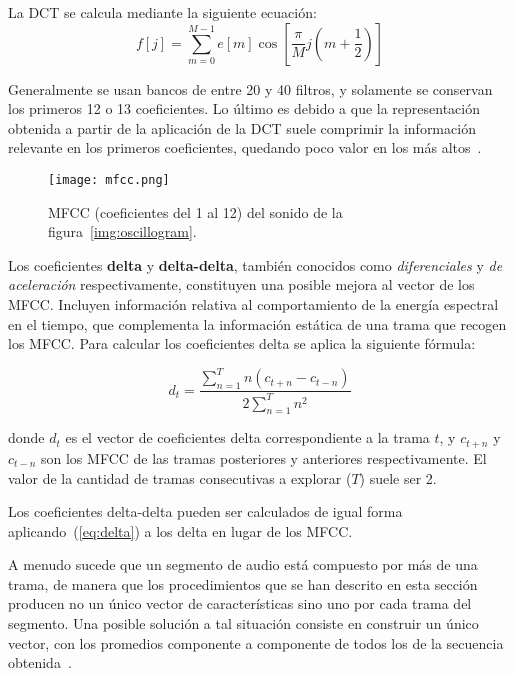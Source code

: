 La DCT se calcula mediante la siguiente ecuación:
\begin{equation}
    \label{eq:DCT}
    f[j] = \sum_{m=0}^{M-1}{e[m]\cos{\left[ \frac{\pi}{M}j\left( m + \frac{1}{2} \right) \right]}}
\end{equation}

Generalmente se usan bancos de entre 20 y 40 filtros, y solamente se conservan los primeros 12 o 13 coeficientes.
Lo último es debido a que la representación obtenida a partir de la aplicación de la DCT suele comprimir la información relevante en los primeros coeficientes, quedando poco valor en los más altos~\cite{Davis80}.

\begin{figure}[!h]
    \centering
    \texttt{[image: mfcc.png]}
    \caption{MFCC (coeficientes del 1 al 12) del sonido de la figura~\ref{img:oscillogram}.}
    \label{img:mfcc}
\end{figure}

Los coeficientes \textbf{delta} y \textbf{delta-delta}, también conocidos como \textit{diferenciales} y \textit{de aceleración} respectivamente,
constituyen una posible mejora al vector de los MFCC\@.
Incluyen información relativa al comportamiento de la energía espectral en el tiempo, que complementa la información estática de una trama que recogen los MFCC\@.
Para calcular los coeficientes delta se aplica la siguiente fórmula:

\begin{equation}
    \label{eq:delta}
    d_t = \frac{\sum_{n=1}^{T}{n(c_{t+n} - c_{t-n})}}{2\sum_{n=1}^{T}{n^2}}
\end{equation}

\noindent
donde $d_t$ es el vector de coeficientes delta correspondiente a la trama $t$, y $c_{t+n}$ y $c_{t-n}$ son los MFCC de las tramas posteriores y anteriores respectivamente.
El valor de la cantidad de tramas consecutivas a explorar ($T$) suele ser 2.

Los coeficientes delta-delta pueden ser calculados de igual forma aplicando~(\ref{eq:delta}) a los delta en lugar de los MFCC\@.

A menudo sucede que un segmento de audio está compuesto por más de una trama, de manera que los procedimientos que se han descrito en esta sección producen no un único vector de características sino uno por cada trama del segmento.
Una posible solución a tal situación consiste en construir un único vector, con los promedios componente a componente de todos los de la secuencia obtenida~\cite{Fagerlund07,Lee06}.